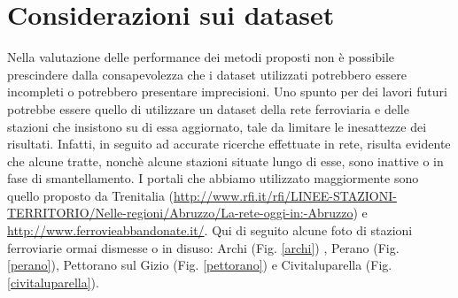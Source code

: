 \section{Considerazioni sui dataset}
Nella valutazione delle performance dei metodi proposti non è possibile prescindere dalla consapevolezza che i dataset utilizzati potrebbero essere incompleti o potrebbero presentare imprecisioni. 
Uno spunto per dei lavori futuri potrebbe essere quello di utilizzare un dataset della rete ferroviaria e delle stazioni che insistono su di essa aggiornato, tale da limitare le inesattezze dei risultati. Infatti, in seguito ad accurate ricerche effettuate in rete, risulta evidente che alcune tratte, nonchè alcune stazioni situate lungo di esse, sono inattive o in fase di smantellamento. I portali che abbiamo utilizzato maggiormente sono quello proposto da Trenitalia (\url{http://www.rfi.it/rfi/LINEE-STAZIONI-TERRITORIO/Nelle-regioni/Abruzzo/La-rete-oggi-in:-Abruzzo}) e \url{http://www.ferrovieabbandonate.it/}.
\newpage
Qui di seguito alcune foto di stazioni ferroviarie ormai dismesse o in disuso: Archi (Fig. \ref{archi}) , Perano (Fig. \ref{perano}), Pettorano sul Gizio (Fig. \ref{pettorano}) e Civitaluparella (Fig. \ref{civitaluparella}).
